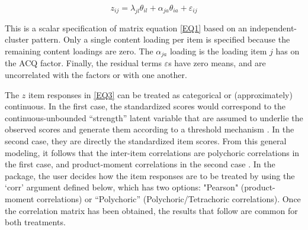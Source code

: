 \begin{equation}
  \label{EQ3}
  z_{ij} = \lambda_{jl}\theta_{il}+\alpha_{ja}\theta_{ia}+\varepsilon_{ij}
\end{equation}

This is a scalar specification of matrix equation \eqref{EQ1} based on an independent-cluster pattern. Only a single content loading per item is specified because the remaining content loadings are zero. The $\alpha_{ja}$ loading is the loading item $j$ has on the ACQ factor. Finally, the residual terms $\varepsilon$s have zero means, and are uncorrelated with the factors or with one another.

The $z$ item responses in \eqref{EQ3} can be treated as categorical or (approximately) continuous. In the first case, the standardized scores would correspond to the continuous-unbounded “strength” latent variable that are assumed to underlie the observed scores and generate them according to a threshold mechanism \citep[see][]{Muthen:1993}. In the second case, they are directly the standardized item scores. From this general modeling, it follows that the inter-item correlations are polychoric correlations in the first case, and product-moment correlations in the second case \citep[see e.g.][for further details]{Ferrando:2013}. In the  package, the user decides how the item responses are to be treated by using the ‘corr’ argument defined below, which has two options: "Pearson" (product-moment correlations) or “Polychoric” (Polychoric/Tetrachoric correlations). Once the correlation matrix has been obtained, the results that follow are common for both treatments.

